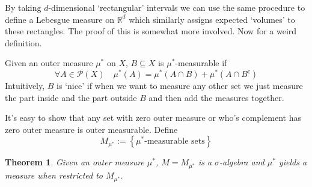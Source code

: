 \documentclass[11pt]{article}
\newcommand{\defeq}{:=}
\newcommand{\sigal}{$\sigma$-algebra}
\newcommand{\stcmp}{^{\mathsf{c}}}
\newcommand{\pow}[1]{\mathcal{P}(#1)}
\newcommand{\R}{\mathbb{R}}
\newenvironment{defin}
	{\begin{mdframed}[backgroundcolor=white, roundcorner=5pt, linewidth=1pt]}
	{\end{mdframed}}
\newcommand{\mdf}[1]{{\color{red} #1}}
\newtheorem{theorem}{Theorem}[section]
\begin{document}
By taking $d$-dimensional `rectangular' intervals we can use the same procedure to define a Lebesgue measure on $\R^d$ which similarly assigns expected `volumes' to these rectangles.
The proof of this is somewhat more involved.
Now for a weird definition.
\begin{defin}
Given an outer measure $\mu^*$ on $X$, $B\subseteq X$ is \mdf{$\mu^*$-measurable} if
\[
	\forall A \in \pow{X} \quad \mu^*(A)=\mu^*(A\cap B)+\mu^*(A\cap B\stcmp)
\]
Intuitively, $B$ is `nice' if when we want to measure any other set we just measure the part inside and the part outside $B$ and then add the measures together.
\end{defin}
It's easy to show that any set with zero outer measure or who's complement has zero outer measure is outer measurable.
Define 
\[
	M_{\mu^*}\defeq\left\{\mu^*\text{-measurable sets}\right\}
\]
\begin{theorem}
	Given an outer measure $\mu^*$, $M=M_{\mu^*}$ is a {\sigal} and $\mu^*$ yields a measure when restricted to $M_{\mu^*}$.
\end{theorem}
\end{document}
